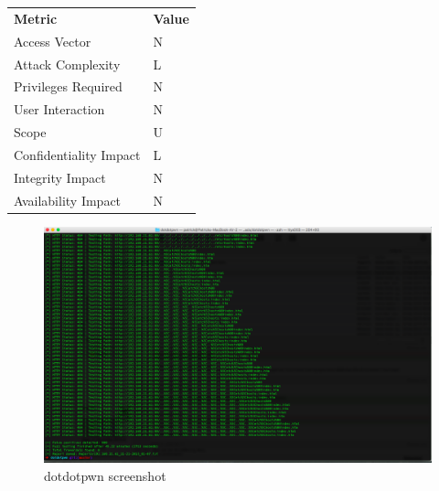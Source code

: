 \documentclass[headsepline,footsepline,footinclude=false,oneside,fontsize=11pt,paper=a4,listof=totoc,bibliography=totoc]{scrbook} %
\begin{document}
\\
\vspace{0.5cm}
\\
\begin{center}
	\begin{tabular}{ll}
		\rowcolor[HTML]{34CDF9}
		{\color[HTML]{ECF4FF} \textbf{Metric}}        & {\color[HTML]{ECF4FF} \textbf{Value}} \\
		\rowcolor[HTML]{BBDAFF}
		{\color[HTML]{333333} Access Vector}          & {\color[HTML]{333333} } N              \\
		\rowcolor[HTML]{ECF4FF}
		{\color[HTML]{333333} Attack Complexity}      & {\color[HTML]{333333} } L              \\
		\rowcolor[HTML]{BBDAFF}
		{\color[HTML]{333333} Privileges Required}    & {\color[HTML]{333333} } N              \\
		\rowcolor[HTML]{ECF4FF}
		{\color[HTML]{333333} User Interaction}       & {\color[HTML]{333333} } N              \\
		\rowcolor[HTML]{BBDAFF}
		{\color[HTML]{333333} Scope}                  & {\color[HTML]{333333} } U              \\
		\rowcolor[HTML]{ECF4FF}
		{\color[HTML]{333333} Confidentiality Impact} & {\color[HTML]{333333} } L              \\
		\rowcolor[HTML]{BBDAFF}
		{\color[HTML]{333333} Integrity Impact}       & {\color[HTML]{333333} } N              \\
		\rowcolor[HTML]{ECF4FF}
		{\color[HTML]{333333} Availability Impact}    & {\color[HTML]{333333} } N
	\end{tabular}
\end{center}

\begin{figure}
	\centering
	\includegraphics[width=\textwidth]{data/dotdotpwn.png}
	\caption{dotdotpwn screenshot}
	\label{fig:dotdotpwn}
\end{figure}
\end{document}
